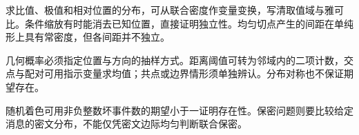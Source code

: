 求比值、极值和相对位置的分布，可从联合密度作变量变换，写清取值域与雅可比。条件缩放有时能消去已知位置，直接证明独立性。均匀切点产生的间距在单纯形上具有常密度，但各间距并不独立。

几何概率必须指定位置与方向的抽样方式。距离阈值可转为邻域内的二项计数，交点与配对可用指示变量求均值；共点或边界情形须单独辨认。分布对称也不保证期望存在。

随机着色可用非负整数坏事件数的期望小于一证明存在性。保密问题则要比较给定消息的密文分布，不能仅凭密文边际均匀判断联合保密。
\par\smallskip
